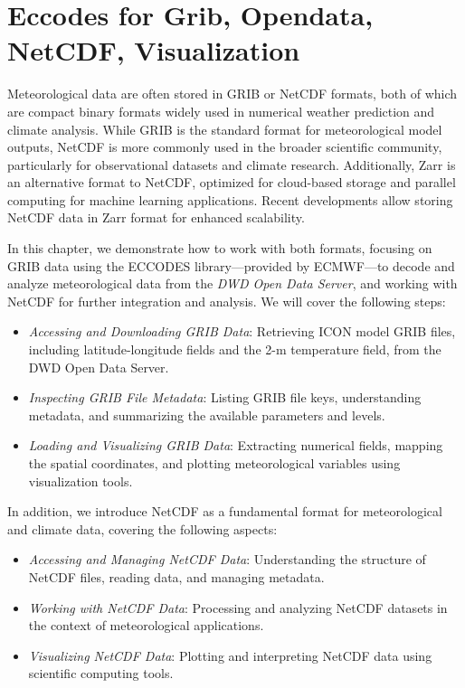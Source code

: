 \chapter{Eccodes for Grib, Opendata, NetCDF, Visualization}

Meteorological data are often stored in GRIB or NetCDF formats, both of which are compact binary formats widely used in numerical weather prediction and climate analysis. While GRIB is the standard format for meteorological model outputs, NetCDF is more commonly used in the broader scientific community, particularly for observational datasets and climate research. Additionally, Zarr is an alternative format to NetCDF, optimized for cloud-based storage and parallel computing for machine learning applications. Recent developments allow storing NetCDF data in Zarr format for enhanced scalability.

In this chapter, we demonstrate how to work with both formats, focusing on GRIB data using the ECCODES library---provided by ECMWF---to decode and analyze meteorological data from the {\em DWD Open Data Server}, and working with NetCDF for further integration and analysis. We will cover the following steps:

\begin{itemize}
    \item {\em Accessing and Downloading GRIB Data}: Retrieving ICON model GRIB files, including latitude-longitude fields and the 2-m temperature field, from the DWD Open Data Server.
    \item {\em Inspecting GRIB File Metadata}: Listing GRIB file keys, understanding metadata, and summarizing the available parameters and levels.
    \item {\em Loading and Visualizing GRIB Data}: Extracting numerical fields, mapping the spatial coordinates, and plotting meteorological variables using visualization tools.
\end{itemize}

In addition, we introduce NetCDF as a fundamental format for meteorological and climate data, covering the following aspects:

\begin{itemize}
    \item {\em Accessing and Managing NetCDF Data}: Understanding the structure of NetCDF files, reading data, and managing metadata.
    \item {\em Working with NetCDF Data}: Processing and analyzing NetCDF datasets in the context of meteorological applications.
    \item {\em Visualizing NetCDF Data}: Plotting and interpreting NetCDF data using scientific computing tools.
\end{itemize}


